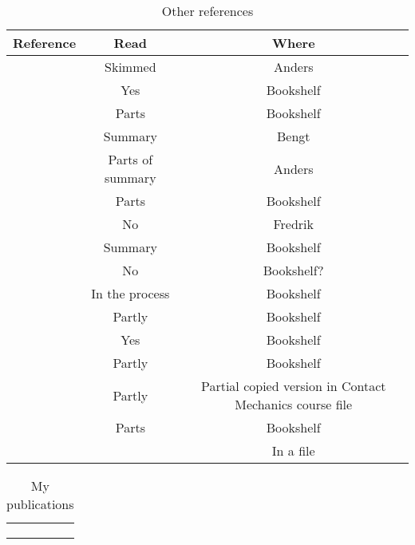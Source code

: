 \documentclass{article}
\begin{document}
\begin{table}
\caption{Other references}
\label{tab:other}
\centering
\begin{tabular}{c|c|c}
Reference & Read & Where\\ \hline
\citet{Lunden1991} & Skimmed & Anders \\
\citet{Wriggers2006book} & Yes & Bookshelf \\
\citet{DoneaHuerta2003book} & Parts & Bookshelf \\
\citet{Jergeus1998phd} & Summary & Bengt \\
\citet{Ahlstrom2001phd} & Parts of summary & Anders \\
\citet{Vernersson2006phd} & Parts & Bookshelf \\
\citet{Hakansson2007phd} & No & Fredrik \\
\citet{Caprioli2011lic} & Summary & Bookshelf \\
\citet{Petersson1999lic} & No & Bookshelf? \\
\citet{Brenner2008book} & In the process & Bookshelf \\
\citet{Johnson1987book} & Partly & Bookshelf \\
\citet{OttosenPetersson1992book} & Yes & Bookshelf \\
\citet{Nielsen2003} & Partly & Bookshelf \\
\citet{Timoshenko1951book} & Partly & Partial copied version in Contact Mechanics course file \\
\citet{Ziegler1983book} & Parts & Bookshelf \\
\citet{Hetnarski2008book} &  & In a file \\
\end{tabular}
\end{table}



\begin{table}
\caption{My publications}
\label{tab:mypublications}
\centering
\begin{tabular}{c}
\hline
\citet{Draganis2011} \\
\citet{Draganis2011lic} \\
\citet{Draganis2014} \\
\hline
\end{tabular}
\end{table}
\end{document}
